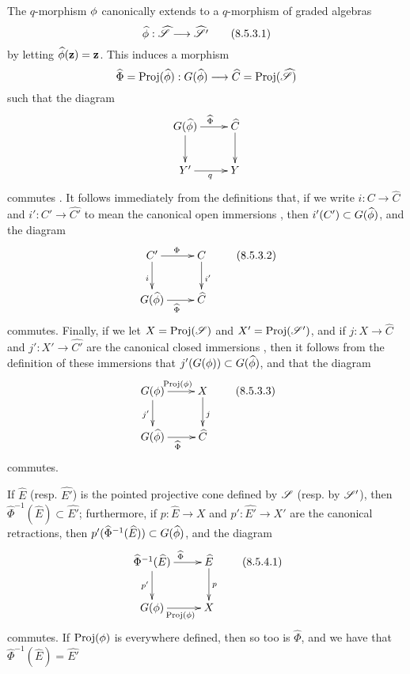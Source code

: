 \begin{env}[8.5.3]
\label{II.8.5.3}
The $q$-morphism $\phi$ canonically extends to a $q$-morphism of graded algebras
\[
\label{II.8.5.3.1}
  \widehat{\vphi}: \widehat{\sh{S}} \to \widehat{\sh{S}'}
\tag{8.5.3.1}
\]
by letting $\widehat{\phi}(\mathbf{z})=\mathbf{z}$.
This induces a morphism
\[
  \widehat{\Phi} = \Proj(\widehat{\vphi}) : G(\widehat{\vphi}) \to \widehat{C} = \Proj(\widehat{\sh{S}})
\]
such that the diagram
\[
  \xymatrix{
    G(\widehat{\vphi})
      \ar[r]^{\widehat{\Phi}}
      \ar[d]
  & \widehat{C}
      \ar[d]
  \\Y'
      \ar[r]_{q}
  & Y
  }
\]
commutes .
It follows immediately from the definitions that, if we write $i:C\to\widehat{C}$ and $i':C'\to\widehat{C'}$ to mean the canonical open immersions , then $i'(C')\subset G(\widehat{\phi})$, and the diagram
\[
\label{eq:2.8.5.3.2}
  \xymatrix{
    C'
      \ar[r]^{\Phi}
      \ar[d]_{i}
  & C
      \ar[d]^{i'}
  \\G(\widehat{\vphi})
      \ar[r]_{\widehat{\Phi}}
  & \widehat{C}
  }
\tag{8.5.3.2}
\]
commutes.
Finally, if we let $X=\operatorname{Proj}(\mathscr{S})$ and $X'=\operatorname{Proj}(\mathscr{S}')$, and if $j:X\to\widehat{C}$ and $j':X'\to\widehat{C'}$ are the canonical closed immersions , then it follows from the definition of these immersions that $j'(G(\phi))\subset G(\widehat{\phi})$, and that the diagram
\[
\label{II.8.5.3.3}
  \xymatrix{
    G(\vphi)
      \ar[r]^{\Proj(\vphi)}
      \ar[d]_{j'}
  & X
      \ar[d]^{j}
  \\G(\widehat{\vphi})
      \ar[r]_{\widehat{\Phi}}
  & \widehat{C}
  }
\tag{8.5.3.3}
\]
commutes.
\end{env}

\begin{proposition}[8.5.4]
\label{II.8.5.4}
If $\widehat{E}$ (resp. $\widehat{E'}$) is the pointed projective cone defined by $\mathscr{S}$ (resp. by $\mathscr{S}'$), then $\widehat{\Phi}^{-1}(\widehat{E}) \subset \widehat{E'}$;
furthermore, if $p:\widehat{E}\to X$ and $p':\widehat{E'}\to X'$ are the canonical retractions, then $p'(\widehat{\Phi}^{-1}(\widehat{E})) \subset G(\widehat{\phi})$, and the diagram
\[
\label{II.8.5.4.1}
  \xymatrix{
    \widehat{\Phi}^{-1}(\widehat{E})
      \ar[r]^{\widehat{\Phi}}
      \ar[d]_{p'}
  & \widehat{E}
      \ar[d]^{p}
  \\G(\vphi)
      \ar[r]_{\Proj(\vphi)}
  & X
  }
\tag{8.5.4.1}
\]
commutes.
If $\operatorname{Proj}(\phi)$ is everywhere defined, then so too is $\widehat{\Phi}$, and we have that $\widehat{\Phi}^{-1}(\widehat{E}) = \widehat{E'}$
\end{proposition}

